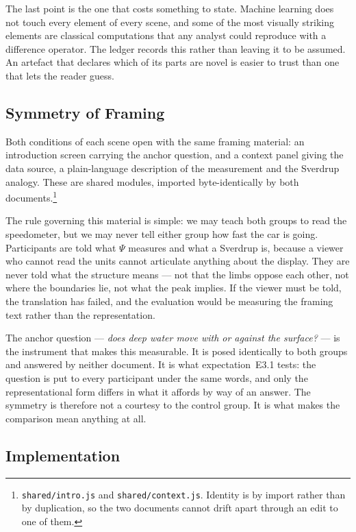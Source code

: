 The last point is the one that costs something to state. Machine learning does
not touch every element of every scene, and some of the most visually striking
elements are classical computations that any analyst could reproduce with a
difference operator. The ledger records this rather than leaving it to be
assumed. An artefact that declares which of its parts are novel is easier to
trust than one that lets the reader guess.

\subsection{Symmetry of Framing}
\label{subsec:symmetry}

Both conditions of each scene open with the same framing material: an
introduction screen carrying the anchor question, and a context panel giving the
data source, a plain-language description of the measurement and the Sverdrup
analogy. These are shared modules, imported byte-identically by both
documents.\footnote{\texttt{shared/intro.js} and \texttt{shared/context.js}.
Identity is by import rather than by duplication, so the two documents cannot
drift apart through an edit to one of them.}

The rule governing this material is simple: we may teach both groups to read the
speedometer, but we may never tell either group how fast the car is going.
Participants are told what $\Psi$ measures and what a Sverdrup is, because a
viewer who cannot read the units cannot articulate anything about the display.
They are never told what the structure means --- not that the limbs oppose each
other, not where the boundaries lie, not what the peak implies. If the viewer
must be told, the translation has failed, and the evaluation would be measuring
the framing text rather than the representation.

The anchor question --- \emph{does deep water move with or against the surface?}
--- is the instrument that makes this measurable. It is posed identically to both
groups and answered by neither document. It is what expectation~E3.1 tests: the
question is put to every participant under the same words, and only the
representational form differs in what it affords by way of an answer. The
symmetry is therefore not a courtesy to the control group. It is what makes the
comparison mean anything at all.

\subsection{Implementation}
\label{subsec:implementation}

